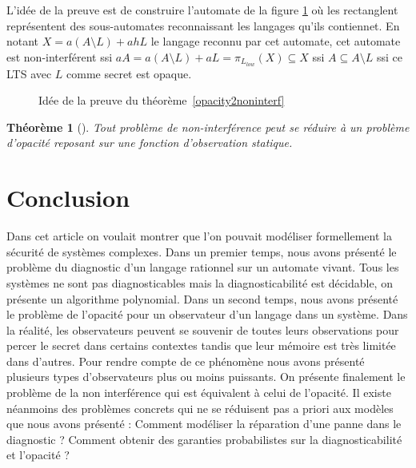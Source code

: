\documentclass[10pt,a4paper]{article}
\newtheorem{myth}{Th\'eor\`eme}
\begin{document}
L'id\'ee de la preuve est de construire l'automate de la figure \ref{thfig} o\`u les rectanglent repr\'esentent des sous-automates reconnaissant les langages qu'ils contiennet. En notant $X=a(A\setminus L) + ahL$ le langage reconnu par cet automate, cet automate est non-interf\'erent ssi $aA=a(A\setminus L)+aL=\pi_{L_{low}}(X)\subseteq X$ ssi $A\subseteq A\setminus L$ ssi ce LTS avec $L$ comme secret est opaque.

\begin{figure}[H]
  \centering
  \caption{Id\'ee de la preuve du th\'eor\`eme~\ref{opacity2noninterf}}
  \label{thfig}
\end{figure}

\begin{myth}[]
Tout probl\`eme de non-interf\'erence peut se r\'eduire \`a un probl\`eme d'opacit\'e reposant sur une fonction d'observation statique.
\end{myth}

\section{Conclusion}

Dans cet article on voulait montrer que l'on pouvait modéliser formellement la sécurité de systèmes complexes. Dans un premier temps, nous avons présenté le problème du diagnostic d'un langage rationnel sur un automate vivant. Tous les systèmes ne sont pas diagnosticables mais la diagnosticabilité est décidable, on présente un algorithme polynomial. Dans un second temps, nous avons présenté le problème de l'opacité  pour un observateur d'un langage dans un système. Dans la réalité, les observateurs peuvent se souvenir de toutes leurs observations pour percer le secret dans certains contextes tandis que leur mémoire est très limitée dans d'autres. Pour rendre compte de ce phénomène nous avons présenté plusieurs types d'observateurs plus ou moins puissants. On présente finalement le problème de la non interférence qui est équivalent à celui de l'opacité. Il existe néanmoins des problèmes concrets qui ne se réduisent pas a priori aux modèles que nous avons présenté : Comment modéliser la réparation d'une panne dans le diagnostic ? Comment obtenir des garanties probabilistes sur la diagnosticabilité et l'opacité ?


\end{document}
